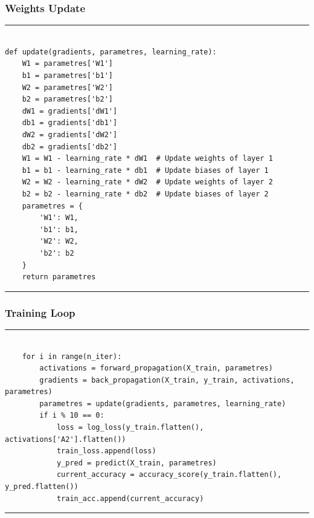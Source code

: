 \documentclass[aspectratio=169]{beamer}
\begin{document}
%
\begin{frame}[fragile]
\frametitle{Weights Update}
\rule{\textwidth}{1pt}
\scriptsize
\begin{verbatim}

def update(gradients, parametres, learning_rate):
    W1 = parametres['W1']
    b1 = parametres['b1']
    W2 = parametres['W2']
    b2 = parametres['b2']
    dW1 = gradients['dW1']
    db1 = gradients['db1']
    dW2 = gradients['dW2']
    db2 = gradients['db2']
    W1 = W1 - learning_rate * dW1  # Update weights of layer 1
    b1 = b1 - learning_rate * db1  # Update biases of layer 1
    W2 = W2 - learning_rate * dW2  # Update weights of layer 2
    b2 = b2 - learning_rate * db2  # Update biases of layer 2
    parametres = {
        'W1': W1,
        'b1': b1,
        'W2': W2,
        'b2': b2
    }
    return parametres
\end{verbatim}
\rule{\textwidth}{1pt}
\end{frame}
%
%
\begin{frame}[fragile]
\frametitle{Training Loop}
\rule{\textwidth}{1pt}
\scriptsize
\begin{verbatim}

    for i in range(n_iter):
        activations = forward_propagation(X_train, parametres)
        gradients = back_propagation(X_train, y_train, activations, parametres)
        parametres = update(gradients, parametres, learning_rate)
        if i % 10 == 0:
            loss = log_loss(y_train.flatten(), activations['A2'].flatten())
            train_loss.append(loss)
            y_pred = predict(X_train, parametres)
            current_accuracy = accuracy_score(y_train.flatten(), y_pred.flatten())
            train_acc.append(current_accuracy)
\end{verbatim}
\rule{\textwidth}{1pt}
\end{frame}
%
\end{document}
